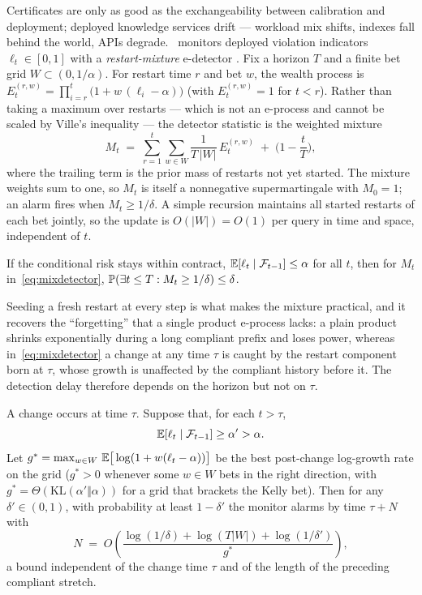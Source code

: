 Certificates are only as good as the exchangeability between
calibration and deployment; deployed knowledge services drift ---
workload mix shifts, indexes fall behind the world, APIs degrade.
\system\ monitors deployed violation indicators $\ell_t \in [0,1]$ with
a \emph{restart-mixture} e-detector
\citep{shin2024edetectors,ramdas2023savi}.
Fix a horizon $T$ and a finite bet grid
$W \subset (0, 1/\alpha)$. For restart time $r$ and bet $w$, the wealth
process is
$E_t^{(r,w)} = \prod_{i=r}^{t} \big(1 + w\,(\ell_i - \alpha)\big)$
(with $E_t^{(r,w)} = 1$ for $t < r$). Rather than taking a maximum over
restarts --- which is not an e-process and cannot be scaled by Ville's
inequality --- the detector statistic is the weighted mixture
\begin{equation}
\label{eq:mixdetector}
M_t \;=\; \sum_{r=1}^{t}\sum_{w \in W}
  \frac{1}{T\,|W|}\, E_t^{(r,w)} \;+\; \Big(1 - \frac{t}{T}\Big),
\end{equation}
where the trailing term is the prior mass of restarts not yet started.
The mixture weights sum to one, so $M_t$ is itself a nonnegative
supermartingale with $M_0 = 1$; an alarm fires when
$M_t \ge 1/\delta$. A simple recursion maintains all started restarts
of each bet jointly, so the update is $O(|W|) = O(1)$ per query in time
and space, independent of $t$.

\begin{proposition}
\label{prop:eprocess}
If the conditional risk stays within contract,
$\mathbb{E}[\ell_t \mid \mathcal{F}_{t-1}] \le \alpha$ for all $t$, then for
$M_t$ in~\eqref{eq:mixdetector},
$\mathbb{P}(\exists t \le T : M_t \ge 1/\delta) \le \delta$.
\end{proposition}

Seeding a fresh restart at every step is what makes the mixture
practical, and it recovers the ``forgetting'' that a single product
e-process lacks: a plain product shrinks exponentially during a long
compliant prefix and loses power, whereas in~\eqref{eq:mixdetector} a
change at any time $\tau$ is caught by the restart component born at
$\tau$, whose growth is unaffected by the compliant history before it.
The detection delay therefore depends on the horizon but not on
$\tau$.

\begin{proposition}
\label{prop:delay}
A change occurs at time $\tau$. Suppose that, for each $t>\tau$,
\[
\mathbb{E}[\ell_t \mid \mathcal{F}_{t-1}] \ge \alpha' > \alpha.
\]
Let
$g^\ast = \max_{w \in W}\, \mathbb{E}\big[\log(1 + w(\ell_t - \alpha))\big]$
be the best post-change log-growth rate on the grid ($g^\ast > 0$
whenever some $w \in W$ bets in the right direction, with
$g^\ast = \Theta(\mathrm{KL}(\alpha' \Vert \alpha))$ for a grid that
brackets the Kelly bet). Then for any $\delta' \in (0,1)$, with
probability at least $1 - \delta'$ the monitor alarms by time
$\tau + N$ with
\[
N \;=\; O\!\left(\frac{\log(1/\delta) + \log(T|W|) +
\log(1/\delta')}{g^\ast}\right),
\]
a bound independent of the change time $\tau$ and of the length of the
preceding compliant stretch.
\end{proposition}

